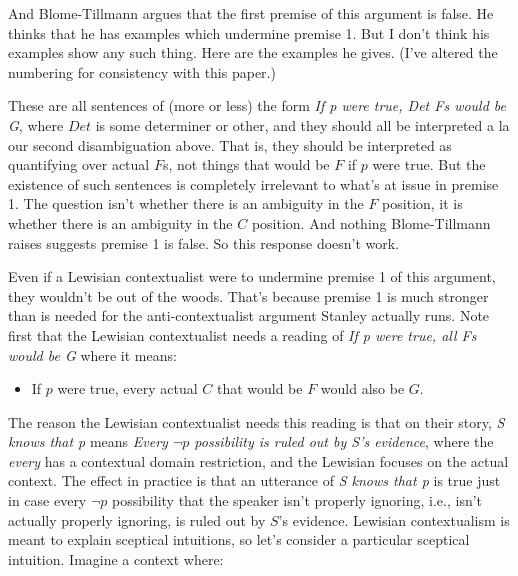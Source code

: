 \noindent And Blome-Tillmann argues that the first premise of this argument is false. He thinks that he has examples which undermine premise 1. But I don't think his examples show any such thing. Here are the examples he gives. (I've altered the numbering for consistency with this paper.)


\noindent These are all sentences of (more or less) the form \textit{If p were true, Det Fs would be G}, where \(Det\) is some determiner or other, and they should all be interpreted a la our second disambiguation above. That is, they should be interpreted as quantifying over actual $F$s, not things that would be $F$ if $p$ were true. But the existence of such sentences is completely irrelevant to what's at issue in premise 1. The question isn't whether there is an ambiguity in the $F$ position, it is whether there is an ambiguity in the $C$ position. And nothing Blome-Tillmann raises suggests premise 1 is false. So this response doesn't work.

Even if a Lewisian contextualist were to undermine premise 1 of this argument, they wouldn't be out of the woods. That's because premise 1 is much stronger than is needed for the anti-contextualist argument Stanley actually runs. Note first that the Lewisian contextualist needs a reading of \textit{If p were true, all Fs would be G} where it means:

\begin{itemize}
\item If $p$ were true, every actual $C$ that would be $F$ would also be $G$.
\end{itemize}

\noindent The reason the Lewisian contextualist needs this reading is that on their story, \textit{S knows that p} means \textit{Every $\neg p$ possibility is ruled out by S's evidence}, where the \textit{every} has a contextual domain restriction, and the Lewisian focuses on the actual context. The effect in practice is that an utterance of \textit{S knows that p} is true just in case every $\neg p$ possibility that the speaker isn't properly ignoring, i.e., isn't actually properly ignoring, is ruled out by $S$'s evidence. Lewisian contextualism is meant to explain sceptical intuitions, so let's consider a particular sceptical intuition. Imagine a context where:

